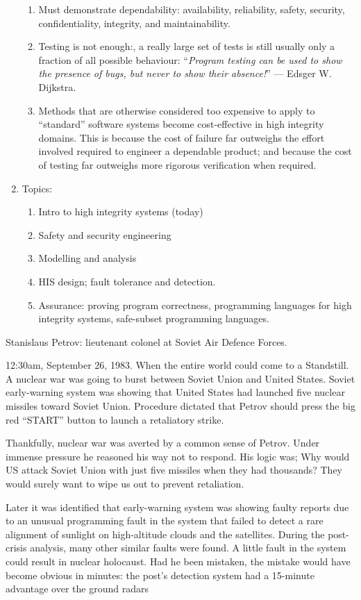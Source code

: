 \documentclass[11pt]{article}
\begin{document}
\begin{enumerate}
    \begin{enumerate}
    \item Must demonstrate dependability: availability, reliability, safety,  security, confidentiality, integrity, and maintainability.
    \item Testing is not enough:, a really large set of tests is still usually only a fraction of all possible behaviour: ``\emph{Program testing can be used to show the presence of bugs, but never to show their absence!}'' --- Edsger W. Dijkstra.
  \item   Methods that are otherwise considered too expensive to apply to ``standard'' software systems become cost-effective in high integrity domains. This is because the cost of failure far outweighs the effort involved required to engineer a dependable product; and because the cost of testing far outweighs more rigorous verification when required.
    \end{enumerate}

 \item Topics:

  \begin{enumerate}
    \item Intro to high integrity systems (today)
    \item Safety and security engineering
    \item Modelling and analysis
    \item HIS design; fault tolerance and detection.
    \item Assurance: proving program correctness, programming languages for high integrity systems, safe-subset programming languages.
  \end{enumerate}


\end{enumerate}

\pagebreak

Stanislaus Petrov: lieutenant colonel at Soviet Air Defence Forces.

12:30am, September 26, 1983. When the entire world could come to a Standstill. A nuclear war was going to burst between Soviet Union and United States. Soviet early-warning system was showing that United States had launched five nuclear missiles toward Soviet Union. Procedure dictated that Petrov should press the big red ``START'' button to launch a retaliatory strike.

Thankfully, nuclear war was averted by a common sense of Petrov. Under immense pressure he reasoned his way not to respond. His logic was; Why would US attack Soviet Union with just five missiles when they had thousands? They would surely want to wipe us out to prevent retaliation. 

Later it was identified that early-warning system was showing faulty reports due to an unusual programming fault in the system that failed to detect a rare alignment of sunlight on high-altitude clouds and the satellites. During the post-crisis analysis, many other similar faults were found. A little fault  in the system could result in nuclear holocaust. Had he been mistaken, the mistake would have become obvious in minutes: the post's detection system had a 15-minute advantage over the ground radars
\end{document}
